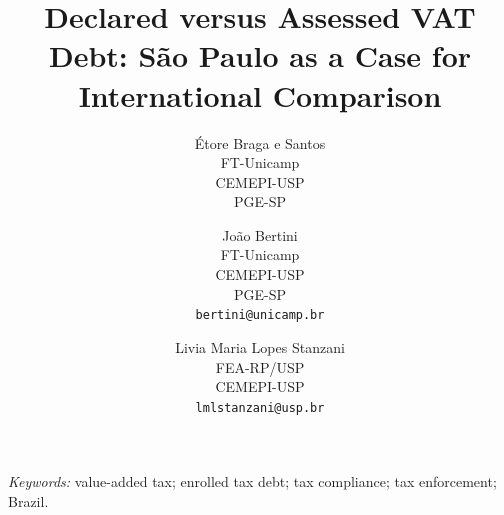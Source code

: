 \documentclass[11pt]{article}
\title{Declared versus Assessed VAT Debt: S\~ao Paulo as a Case for International Comparison}
\author{%
  \'Etore Braga e Santos \\ FT-Unicamp \\ CEMEPI-USP \\ PGE-SP
  \and
  Jo\~ao Bertini \\ FT-Unicamp \\ CEMEPI-USP \\ PGE-SP \\ \texttt{bertini@unicamp.br}
  \and
  Livia Maria Lopes Stanzani \\ FEA-RP/USP \\ CEMEPI-USP \\ \texttt{lmlstanzani@usp.br}
}
\date{}
\begin{document}
\maketitle

\begin{abstract}
\noindent

\end{abstract}

\vspace{0.5em}
\noindent\textit{Keywords:} value-added tax; enrolled tax debt; tax compliance; tax enforcement; Brazil.










\clearpage




\end{document}
